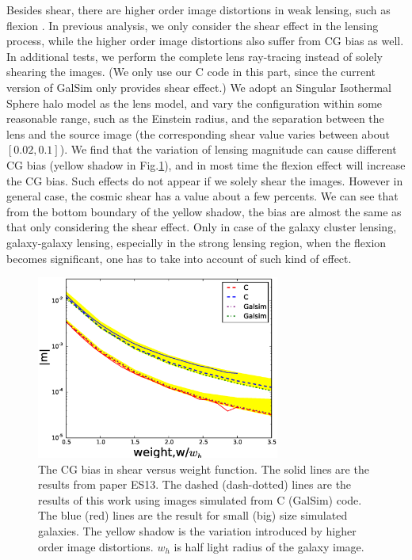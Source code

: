 \documentclass[useAMS,usenatbib]{mn2e}
\begin{document}
Besides shear, there are higher order image distortions in weak lensing,
such as flexion \citep[e.g.][]{2002ApJ...564...65G,bacon2006}. In
previous analysis, we only consider the shear effect in the lensing
process, while the higher order image distortions also suffer from CG
bias as well. In additional tests, we perform the complete lens
ray-tracing instead of solely shearing the images. (We only use our C
code in this part, since the current version of GalSim only provides
shear effect.) We adopt an Singular Isothermal Sphere halo model as
the lens model, and vary the configuration within some reasonable
range, such as the Einstein radius, and the separation between the
lens and the source image (the corresponding shear value varies
between about $[0.02, 0.1]$). We find that the variation of lensing
magnitude can cause different CG bias (yellow shadow in
Fig.\ref{fig:biasofweight}), and in most time the flexion effect will
increase the CG bias. Such effects do not appear if we solely shear
the images. However in general case, the cosmic shear has a value
about a few percents. We can see that from the bottom boundary of the
yellow shadow, the bias are almost the same as that only considering
the shear effect. Only in case of the galaxy cluster lensing,
galaxy-galaxy lensing, especially in the strong lensing region, when
the flexion becomes significant, one has to take into account of such
kind of effect.


%
\begin{figure}
\centerline{\includegraphics[width=8.0cm]{cvsgalsim.eps}}
\caption{The CG bias in shear versus weight function.  The
  solid lines are the results from paper ES13. The dashed
  (dash-dotted) lines are the results of this work using images
  simulated from C (GalSim) code. The blue (red) lines are the result
  for small (big) size simulated galaxies. The yellow shadow is the
  variation introduced by higher order image distortions. $w_h$ is
  half light radius of the galaxy image.}
\label{fig:biasofweight}
\end{figure}
\end{document}
